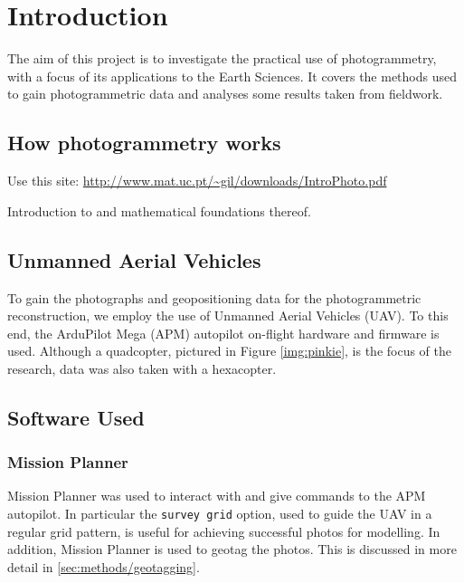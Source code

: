 \section{Introduction}

The aim of this project is to investigate the practical use of photogrammetry,
with a focus of its applications to the Earth Sciences. It covers the methods
used to gain photogrammetric data and analyses some results taken from
fieldwork.

\subsection{How photogrammetry works}

Use this site: \url{http://www.mat.uc.pt/~gil/downloads/IntroPhoto.pdf}

Introduction to and mathematical foundations thereof.

\subsection{Unmanned Aerial Vehicles}

To gain the photographs and geopositioning data for the photogrammetric
reconstruction, we employ the use of Unmanned Aerial Vehicles (UAV). To this
end, the ArduPilot Mega (APM) autopilot
on-flight hardware and firmware is used.  Although a quadcopter, pictured in
Figure \ref{img:pinkie}, is the focus of the research, data was also taken with
a hexacopter.


\subsection{Software Used}

\subsubsection{Mission Planner}

Mission Planner was used to interact with
and give commands to the APM autopilot. In particular the \texttt{survey grid}
option, used to guide the UAV in a regular grid pattern, is useful for achieving
successful photos for modelling. In addition, Mission Planner is used to geotag
the photos. This is discussed in more detail in \ref{sec:methods/geotagging}.


